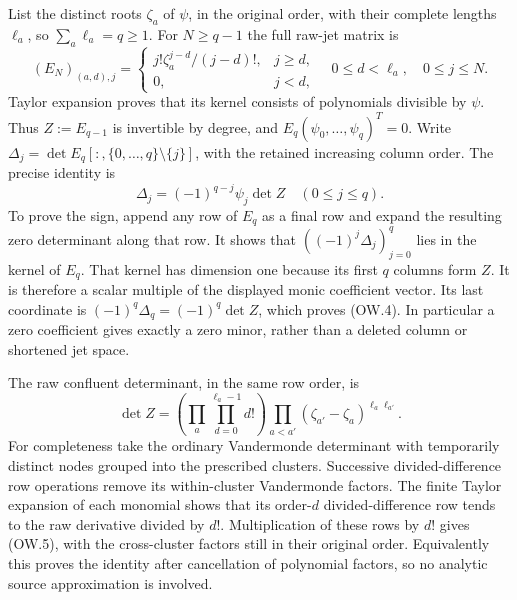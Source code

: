 List the distinct roots $\zeta_a$ of $\psi$, in the original order,
with their complete lengths $\ell_a$, so $\sum_a\ell_a=q\ge1$.
For $N\ge q-1$ the full raw-jet matrix is
\[
 (E_N)_{(a,d),j}=
 \begin{cases}j!\zeta_a^{j-d}/(j-d)!,&j\ge d,\\0,&j<d,
 \end{cases}
 \quad 0\le d<\ell_a,\quad0\le j\le N.                  \tag{OW.3}
\]
Taylor expansion proves that its kernel consists of polynomials
divisible by $\psi$. Thus $Z:=E_{q-1}$ is invertible by degree,
and $E_q(\psi_0,\ldots,\psi_q)^T=0$. Write
$\Delta_j=\det E_q[:,\{0,\ldots,q\}\setminus\{j\}]$, with
the retained increasing column order. The precise identity is
\[
 \boxed{\Delta_j=(-1)^{q-j}\psi_j\det Z\quad(0\le j\le q).}
 \tag{OW.4}
\]
To prove the sign, append any row of $E_q$ as a final row and expand
the resulting zero determinant along that row. It shows that
$((-1)^j\Delta_j)_{j=0}^q$ lies in the kernel of $E_q$.
That kernel has dimension one because its first $q$ columns form $Z$.
It is therefore a scalar multiple of the displayed monic coefficient
vector. Its last coordinate is $(-1)^q\Delta_q=(-1)^q\det Z$,
which proves (OW.4). In particular a zero coefficient gives exactly
a zero minor, rather than a deleted column or shortened jet space.

The raw confluent determinant, in the same row order, is
\[
 \det Z=\left(\prod_a\prod_{d=0}^{\ell_a-1}d!\right)
          \prod_{a<a'}(\zeta_{a'}-\zeta_a)^{\ell_a\ell_{a'}}.
 \tag{OW.5}
\]
For completeness take the ordinary Vandermonde determinant with
temporarily distinct nodes grouped into the prescribed clusters.
Successive divided-difference row operations remove its within-cluster
Vandermonde factors. The finite Taylor expansion of each monomial
shows that its order-$d$ divided-difference row tends to the raw
derivative divided by $d!$. Multiplication of these rows by $d!$
gives (OW.5), with the cross-cluster factors still in their original
order. Equivalently this proves the identity after cancellation of
polynomial factors, so no analytic source approximation is involved.

